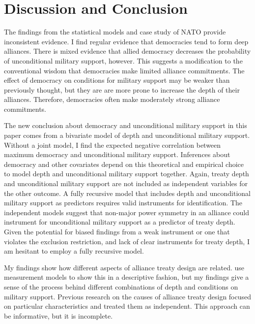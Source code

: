 \documentclass[12pt]{article}
\begin{document}
\section{Discussion and Conclusion}


The findings from the statistical models and case study of NATO provide inconsistent evidence. 
I find regular evidence that democracies tend to form deep alliances.
There is mixed evidence that allied democracy decreases the probability of unconditional military support, however. 
This suggests a modification to the conventional wisdom that democracies make limited alliance commitments.
The effect of democracy on conditions for military support may be weaker than previously thought, but they are are more prone to increase the depth of their alliances. 
Therefore, democracies often make moderately strong alliance commitments. 


The new conclusion about democracy and unconditional military support in this paper comes from a bivariate model of depth and unconditional military support.
Without a joint model, I find the expected negative correlation between maximum democracy and unconditional military support.  
Inferences about democracy and other covariates depend on this theoretical and empirical choice to model depth and unconditional military support together. 
Again, treaty depth and unconditional military support are not included as independent variables for the other outcome. 
A fully recursive model that includes depth and unconditional military support as predictors requires valid instruments for identification. 
The independent models suggest that non-major power symmetry in an alliance could instrument for unconditional military support as a predictor of treaty depth. 
Given the potential for biased findings from a weak instrument or one that violates the exclusion restriction, and lack of clear instruments for treaty depth, I am hesitant to employ a fully recursive model.  


My findings show how different aspects of alliance treaty design are related. 
\citet{BensonClinton2016} use measurement models to show this in a descriptive fashion, but my findings give a sense of the process behind different combinations of depth and conditions on military support. 
Previous research on the causes of alliance treaty design \citep{Benson2012, Mattes2012, Chibaetal2015} focused on particular characteristics and treated them as independent. 
This approach can be informative, but it is incomplete. 
\end{document}

